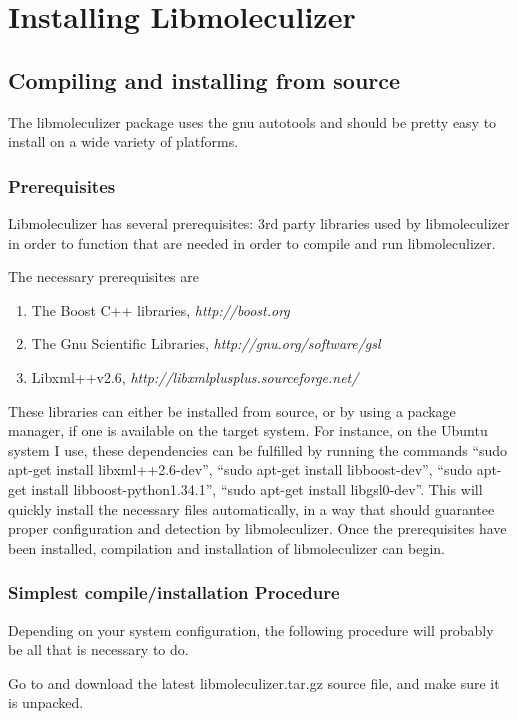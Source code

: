 \chapter{Installing Libmoleculizer}
\section{Compiling and installing from source}
The libmoleculizer package uses the gnu autotools and should be
pretty easy to install on a wide variety of platforms. 

\subsection{Prerequisites}
Libmoleculizer has several prerequisites: 3rd party libraries used by
libmoleculizer in order to function that are needed in order to
compile and run libmoleculizer.

The necessary prerequisites are
\begin{enumerate}
\item The Boost C++ libraries, 
  \emph{http://boost.org}
\item The Gnu Scientific Libraries, 
  \emph{http://gnu.org/software/gsl}
\item Libxml++v2.6, 
  \emph{http://libxmlplusplus.sourceforge.net/}
\end{enumerate}

These libraries can either be installed from source, or by using a
package manager, if one is available on the target system.  For
instance, on the Ubuntu system I use, these dependencies can be
fulfilled by running the commands ``sudo apt-get install
libxml++2.6-dev'', ``sudo apt-get install libboost-dev'', ``sudo apt-get
install libboost-python1.34.1'', ``sudo apt-get install
libgsl0-dev''.  This will quickly install the necessary files
automatically, in a way that should guarantee proper configuration and
detection by libmoleculizer.  Once the prerequisites have been
installed, compilation and installation of libmoleculizer can begin.

\subsection{Simplest compile/installation Procedure}
Depending on your system configuration, the following procedure will
probably be all that is necessary to do.

Go to \libmzrwebsite and download the latest
  libmoleculizer.tar.gz source file, and make sure it is unpacked.  

